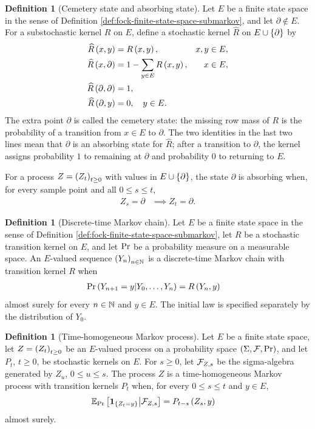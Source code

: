 \documentclass[11pt,a4paper]{article}
\theoremstyle{plain}
\theoremstyle{definition}
\newtheorem{defn}[thm]{Definition}
\theoremstyle{remark}
\begin{document}
\begin{defn}[Cemetery state and absorbing state]\label{def:fock-cemetery-absorbing-state}
Let $E$ be a finite state space in the sense of
Definition \ref{def:fock-finite-state-space-submarkov}, and let $\partial\notin E$.
For a substochastic kernel $R$ on $E$, define a stochastic kernel $\widehat{R}$ on
$E\cup\left\{ \partial \right\}$ by
$$\begin{aligned}
\fun{\widehat{R}}{x,y}
& =
\fun{R}{x,y},
&
x,y
& \in E,
\\
\fun{\widehat{R}}{x,\partial}
& =
1-\sum_{y\in E}\fun{R}{x,y},
&
x
& \in E,
\\
\fun{\widehat{R}}{\partial,\partial}
& =
1,
\\ %
\fun{\widehat{R}}{\partial,y}
& =
0,
\quad y\in E.
\end{aligned}$$
The extra point $\partial$ is called the cemetery state: the missing row mass of $R$ is the probability of a
transition from $x\in E$ to $\partial$.
The two identities in the last two lines mean that $\partial$ is an absorbing state for $\widehat{R}$; after a
transition to $\partial$, the kernel assigns probability $1$ to remaining at $\partial$ and probability $0$ to
returning to $E$.

For a process $Z=\seq{Z_t}{t\geq0}$ with values in $E\cup\left\{ \partial \right\}$, the state $\partial$ is absorbing
when, for every sample point and all $0\leq s\leq t$,
$$\begin{aligned}
Z_s=\partial
& \implies
Z_t=\partial.
\end{aligned}$$
\end{defn}

\begin{defn}[Discrete-time Markov chain]
Let $E$ be a finite state space in the sense of Definition \ref{def:fock-finite-state-space-submarkov}, let $R$
be a stochastic transition kernel on $E$, and let $\mathrm{Pr}$ be a probability measure on a measurable space.
An $E$-valued sequence $\seq{Y_n}{n\in\monnat}$ is a discrete-time Markov chain with transition kernel $R$ when
$$\begin{aligned}
\mathrm{Pr} \left( Y_{n+1}=y \middle| Y_0,\ldots,Y_n \right)
& =
R \left( Y_n,y \right)
\end{aligned}$$
almost surely for every $n\in\mathbb{N}$ and $y\in E$.
The initial law is specified separately by the distribution of $Y_0$.
\end{defn}

\begin{defn}[Time-homogeneous Markov process]\label{def:fock-time-homogeneous-markov-process}
Let $E$ be a finite state space, let
$Z=\seq{Z_t}{t\geq0}$ be an $E$-valued process on a probability space
$\left( \Sigma,\mathcal{F},\mathrm{Pr} \right)$, and let $P_t$, $t\geq0$, be stochastic kernels on $E$.
For $s\geq0$, let $\mathcal{F}_{Z,s}$ be the sigma-algebra generated by $Z_u$, $0\leq u\leq s$.
The process $Z$ is a time-homogeneous Markov process with transition kernels $P_t$ when, for every
$0\leq s\leq t$ and $y\in E$,
$$\begin{aligned}
\mathbb{E}_{\mathrm{Pr}} \left[ 
\boldsymbol{1}_{\left\{ Z_t=y \right\}}
 \middle| \mathcal{F}_{Z,s} \right]
& =
P_{t-s} \left( Z_s,y \right)
\end{aligned}$$
almost surely.
\end{defn}
\end{document}
